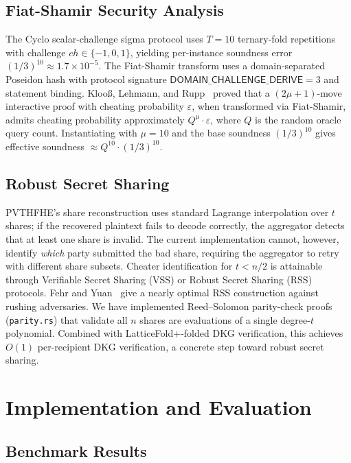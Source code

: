 \documentclass{llncs}
\begin{document}
\subsection{Fiat-Shamir Security Analysis}

The Cyclo scalar-challenge sigma protocol uses $T=10$ ternary-fold repetitions
with challenge $ch \in \{-1,0,1\}$, yielding per-instance soundness error
$(1/3)^{10} \approx 1.7 \times 10^{-5}$.
The Fiat-Shamir transform uses a domain-separated Poseidon hash with protocol
signature $\mathsf{DOMAIN\_CHALLENGE\_DERIVE}=3$ and statement binding.
%
Kloo{\ss}, Lehmann, and Rupp~\cite{klooss2023} proved that a $(2\mu+1)$-move
interactive proof with cheating probability $\varepsilon$, when transformed
via Fiat-Shamir, admits cheating probability approximately $Q^{\mu} \cdot
\varepsilon$, where $Q$ is the random oracle query count.
%
Instantiating with $\mu=10$ and the base soundness $(1/3)^{10}$ gives
effective soundness $\approx Q^{10} \cdot (1/3)^{10}$.

\subsection{Robust Secret Sharing}

PVTHFHE's share reconstruction uses standard Lagrange interpolation over $t$ shares;
if the recovered plaintext fails to decode correctly, the aggregator detects that at
least one share is invalid. The current implementation cannot, however, identify
\emph{which} party submitted the bad share, requiring the aggregator to retry with
different share subsets. Cheater identification for $t < n/2$ is attainable through
Verifiable Secret Sharing (VSS) or Robust Secret Sharing (RSS) protocols.
Fehr and Yuan~\cite{fehr2019rss} give a nearly optimal RSS construction against
rushing adversaries. We have implemented Reed--Solomon parity-check proofs (\texttt{parity.rs}) that validate all $n$ shares are evaluations of a single degree-$t$ polynomial. Combined with LatticeFold+-folded DKG verification, this achieves $O(1)$ per-recipient DKG verification, a concrete step toward robust secret sharing.

\section{Implementation and Evaluation}

\subsection{Benchmark Results}
\end{document}
